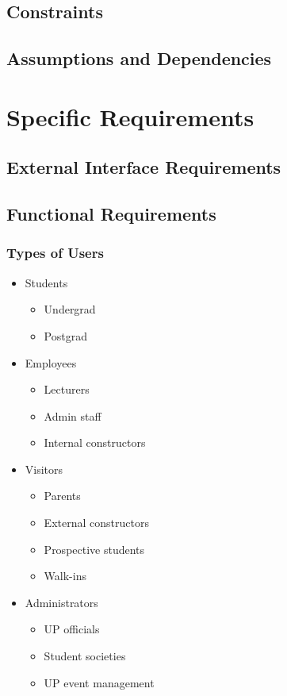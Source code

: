 \documentclass[12pt, a4paper]{article}
\begin{document}
	\subsection{Constraints}
	\subsection{Assumptions and Dependencies}

\section{Specific Requirements}
	\subsection{External Interface Requirements}
	\subsection{Functional Requirements}
		\subsubsection{Types of Users}
			\begin{itemize}
				\item Students
				\begin{itemize}
					\item Undergrad
					\item Postgrad
				\end{itemize}
				
				\item Employees
				\begin{itemize}
					\item Lecturers
					\item Admin staff
					\item Internal constructors
				\end{itemize}
				
				\item Visitors
				\begin{itemize}
					\item Parents
					\item External constructors
					\item Prospective students
					\item Walk-ins
				\end{itemize}
				
				\item Administrators
				\begin{itemize}
					\item UP officials
					\item Student societies
					\item UP event management
				\end{itemize}
			\end{itemize}
\end{document}
